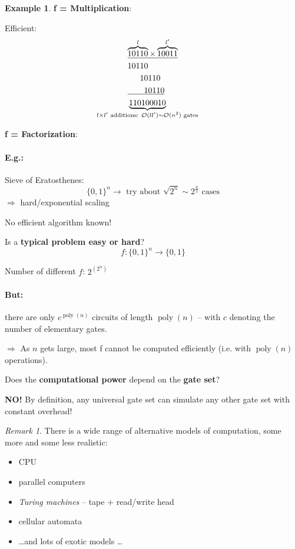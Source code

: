 \documentclass[a4paper, 12pt]{article}
\theoremstyle{plain}
\theoremstyle{definition}
\newtheorem*{example}{Example}
\theoremstyle{remark}
\newtheorem*{remark}{Remark}
\DeclareMathOperator{\poly}{poly}
\begin{document}
\begin{example}
  \textbf{f = Multiplication}:

  Efficient:
  \begin{align*}
    &\underline{\overbrace{10110}^{l} \times \overbrace{10011}^{l'}} \\
    &10110\\
    &\phantom{101}10110\\
    &\underline{\phantom{1011}10110}\\
    &\underbrace{110100010}_{\mathclap{l \times l' \text{ additions: } \mathcal{O}(ll') \sim \mathcal{O}(n^2)\text{ gates}}}
  \end{align*}

  \textbf{f = Factorization}:

  \paragraph{E.g.:} Sieve of Eratosthenes:
  \begin{equation*}
    \{0,1\}^n \rightarrow \text{ try about }\sqrt{2^n} \sim 2^{\frac{n}{2}} \text{ cases}
  \end{equation*}
  $\Longrightarrow$ hard/exponential scaling

  No efficient algorithm known!
\end{example}

Is a \textbf{typical problem easy or hard}?
\begin{equation*}
  f: \{0,1\}^n \rightarrow \{0,1\}
\end{equation*}

Number of different $f$: $2^{(2^n)}$

\paragraph{But:} there are only $c^{\poly(n)}$ circuits of length $\poly(n)$ -- with $c$ denoting the number of elementary gates.

$\Longrightarrow$ As $n$ gets large, most f cannot be computed efficiently (i.e. with $\poly(n)$ operations).

Does the \textbf{computational power} depend on the \textbf{gate set}?

\textbf{NO!} By definition, any universal gate set can simulate any other gate set with constant overhead!

\begin{remark}
  There is a wide range of alternative models of computation, some more and some less realistic:
  \begin{itemize}
    \item CPU
    \item parallel computers
    \item \emph{Turing machines} -- tape + read/write head
    \item cellular automata
    \item \ldots and lots of exotic models \ldots
  \end{itemize}
\end{remark}
\end{document}
